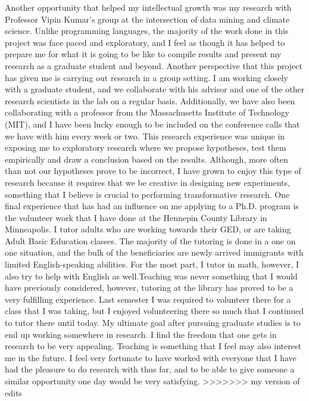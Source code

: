 \documentclass[a4paper,12pt]{article}
\newcommand{\tab}{\hspace*{2em}}
\begin{document}
\tab Another opportunity that helped my intellectual growth was my research with Professor Vipin Kumar's group at the intersection of data mining and climate science. Unlike programming languages, the majority of the work done in this project was face paced and exploratory, and I feel as though it has helped to prepare me for what it is going to be like to compile results and present my research as a graduate student and beyond. Another perspective that this project has given me is carrying out research in a group setting. I am working closely with a graduate student, and we collaborate with his advisor and one of the other research scientists in the lab on a regular basis. Additionally, we have also been collaborating with a professor from the Massachusetts Institute of Technology (MIT), and I have been lucky enough to be included on the conference calls that we have with him every week or two. This research experience was unique in exposing me to exploratory research where we propose hypotheses, test them empirically and draw a conclusion based on the results. Although, more often than not our hypotheses prove to be incorrect, I have grown to enjoy this type of research because it requires that we be creative in designing new experiments, something that I believe is crucial to performing transformative research.\newline
\tab One final experience that has had an influence on me applying to a Ph.D. program is the volunteer work that I have done at the Hennepin County Library in Minneapolis. I tutor adults who are working towards their GED, or are taking Adult Basic Education classes. The majority of the tutoring is done in a one on one situation, and the bulk of the beneficiaries are newly arrived immigrants with limited English-speaking abilities. For the most part, I tutor in math, however, I also try to help with English as well.Teaching was never something that I would have previously considered, however, tutoring at the library has proved to be a very fulfilling experience.  Last semester I was required to volunteer there for a class that I was taking, but I enjoyed volunteering there so much that I continued to tutor there until today.  \newline
\tab My ultimate goal after pursuing graduate studies is to end up working somewhere in research.  I find the freedom that one gets in research to be very appealing.  Teaching is something that I feel may also interest me in the future.  I feel very fortunate to have worked with everyone that I have had the pleasure to do research with thus far, and to be able to give someone a similar opportunity one day would be very satisfying.
>>>>>>> my version of edits
\end{document}
